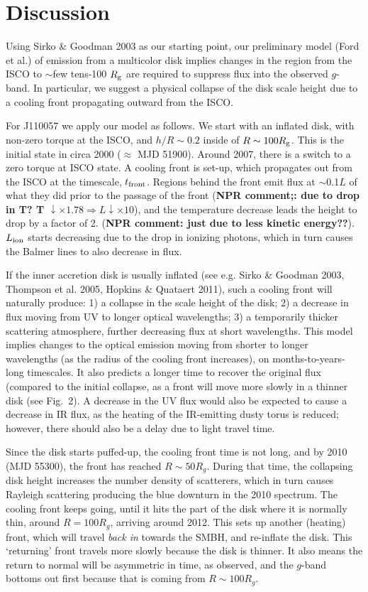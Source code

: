 \documentclass{nature}
\begin{document}
\section{Discussion}   
Using Sirko \& Goodman 2003 as our starting point, our preliminary
model (Ford et al.) of emission from a multicolor disk implies changes
in the region from the ISCO to $\sim$few tens-100 $R_{\rm g}$ are
required to suppress flux into the observed $g$-band. In particular,
we suggest a physical collapse of the disk scale height due to a
cooling front propagating outward from the ISCO.

For J110057 we apply our model as follows. We start with an inflated
disk, with non-zero torque at the ISCO, and $h/R\sim0.2$ inside of
$R\sim100 R_{\rm g}$.  This is the initial state in circa 2000
($\approx$ MJD 51900).  Around 2007, there is a switch to a zero
torque at ISCO state. A cooling front is set-up, which propagates out
from the ISCO at the timescale, $t_{\rm front}$. Regions behind the
front emit flux at $\sim$0.1$L$ of what they did prior to the passage
of the front ({\bf NPR comment;: due to drop in T?  T $\downarrow
\times 1.78 \Rightarrow L \downarrow \times10$}), and the temperature
decrease leads the height to drop by a factor of 2.  ({\bf NPR
comment: just due to less kinetic energy??}).  $L_{\rm ion}$ starts
decreasing due to the drop in ionizing photons, which in turn causes
the Balmer lines to also decrease in flux.

If the inner accretion disk is usually inflated (see e.g. Sirko \&
Goodman 2003, Thompson et al. 2005, Hopkins \& Quataert 2011), such a
cooling front will naturally produce: 1) a collapse in the scale
height of the disk; 2) a decrease in flux moving from UV to longer
optical wavelengths; 3) a temporarily thicker scattering atmosphere,
further decreasing flux at short wavelengths.  This model implies
changes to the optical emission moving from shorter to longer
wavelengths (as the radius of the cooling front increases), on
months-to-years-long timescales. It also predicts a longer time to
recover the original flux (compared to the initial collapse, as a
front will move more slowly in a thinner disk (see Fig.~2). A decrease
in the UV flux would also be expected to cause a decrease in IR flux,
as the heating of the IR-emitting dusty torus is reduced; however,
there should also be a delay due to light travel time.

Since the disk starts puffed-up, the cooling front time is not long,
and by 2010 (MJD 55300), the front has reached $R\sim50 R_{g}$. During
that time, the collapsing disk height increases the number density of
scatterers, which in turn causes Rayleigh scattering producing the
blue downturn in the 2010 spectrum.  The cooling front keeps going,
until it hits the part of the disk where it is normally thin, around
$R=100 R_g$, arriving around 2012. This sets up another (heating)
front, which will travel {\it back in} towards the SMBH, and
re-inflate the disk. This `returning' front travels more slowly
because the disk is thinner. It also means the return to normal will
be asymmetric in time, as observed, and the $g$-band bottoms out first
because that is coming from $R\sim100R_{g}$.
\end{document}
